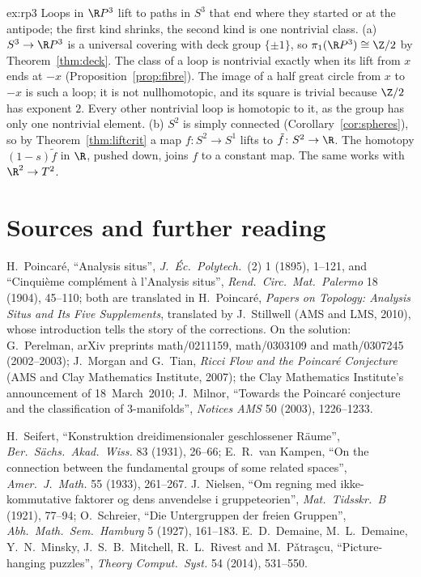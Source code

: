\begin{solution}{ex:rp3}
\idea Loops in $\R P^3$ lift to paths in $S^3$ that end where they started or at the antipode; the first kind shrinks, the second kind is one nontrivial class.
\writeup (a) $S^3\to\R P^3$ is a universal covering with deck group $\{\pm1\}$, so $\pi_1(\R P^3)\cong\Z/2$ by Theorem~\ref{thm:deck}. The class of a loop is nontrivial exactly when its lift from $x$ ends at $-x$
(Proposition~\ref{prop:fibre}). The image of a half great circle from $x$ to $-x$ is such a loop; it is not nullhomotopic, and its square is trivial because $\Z/2$ has exponent $2$. Every other nontrivial
loop is homotopic to it, as the group has only one nontrivial element. (b) $S^2$ is simply connected (Corollary~\ref{cor:spheres}), so by Theorem~\ref{thm:liftcrit} a map $f\colon S^2\to S^1$ lifts to
$\tilde f\colon S^2\to\R$. The homotopy $(1-s)\tilde f$ in $\R$, pushed down, joins $f$ to a constant map. The same works with $\R^2\to T^2$.
\end{solution}

\section*{Sources and further reading}

H.~Poincar\'e, ``Analysis situs'', \emph{J.\ \'Ec.\ Polytech.}\ (2) 1 (1895), 1--121, and ``Cinqui\`eme compl\'ement \`a l'Analysis situs'', \emph{Rend.\ Circ.\ Mat.\ Palermo} 18 (1904), 45--110; both are
translated in H.~Poincar\'e, \emph{Papers on Topology: Analysis Situs and Its Five Supplements}, translated by J.~Stillwell (AMS and LMS, 2010), whose introduction tells the story of the corrections. On the
solution: G.~Perelman, arXiv preprints math/0211159, math/0303109 and math/0307245 (2002--2003); J.~Morgan and G.~Tian, \emph{Ricci Flow and the Poincar\'e Conjecture} (AMS and Clay Mathematics
Institute, 2007); the Clay Mathematics Institute's announcement of 18~March~2010; J.~Milnor, ``Towards the Poincar\'e conjecture and the classification of 3-manifolds'', \emph{Notices AMS} 50 (2003), 1226--1233.

H.~Seifert, ``Kon\-struk\-tion drei\-di\-men\-sio\-na\-ler ge\-schlos\-se\-ner R\"aume'', \emph{Ber.\ S\"achs.\ Akad.\ Wiss.} 83 (1931), 26--66; E.~R.~van Kampen, ``On the connection between the fundamental groups of
some related spaces'', \emph{Amer.\ J.\ Math.} 55 (1933), 261--267. J.~Nielsen, ``Om regning med ikke-kommutative faktorer og dens anvendelse i gruppeteorien'', \emph{Mat.\ Tidsskr.\ B} (1921), 77--94;
O.~Schreier, ``Die Untergruppen der freien Gruppen'', \emph{Abh.\ Math.\ Sem.\ Hamburg} 5 (1927), 161--183. E.~D.~Demaine, M.~L.~Demaine, Y.~N.~Minsky, J.~S.~B.~Mitchell, R.~L.~Rivest and M.~P\v atra\c scu,
``Picture-hanging puzzles'', \emph{Theory Comput.\ Syst.} 54 (2014), 531--550.

